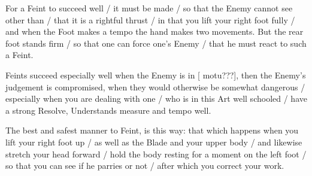 
For a Feint to succeed well / it must be made / so that the Enemy
cannot see other than / that it is a rightful thrust / in that you
lift your right foot fully / and when the Foot makes a tempo the hand
makes two movements. But the rear foot stands firm / so that one can
force one's Enemy / that he must react to such a Feint.


Feints succeed especially well when the Enemy is in [ motu???], then
the Enemy's judgement is compromised, when they would otherwise be
somewhat dangerous / especially when you are dealing with one / who is
in this Art well schooled / have a strong Resolve, Understands measure
and tempo well.


The best and safest manner to Feint, is this way: that which happens
when you lift your right foot up / as well as the Blade and your upper
body / and likewise stretch your head forward / hold the body resting for a
moment on the left foot / so that you can see if he parries or not /
after which you correct your work.
